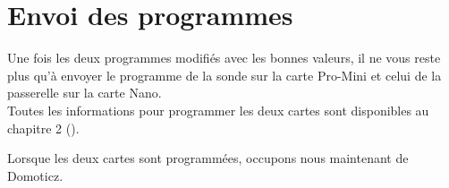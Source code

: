 \section{Envoi des programmes}

Une fois les deux programmes modifiés avec les bonnes valeurs, il ne vous reste plus qu'à envoyer le programme de la sonde sur la carte Pro-Mini et celui de la passerelle sur la carte Nano.\\
Toutes les informations pour programmer les deux cartes sont disponibles au chapitre 2 ().

Lorsque les deux cartes sont programmées, occupons nous maintenant de Domoticz.



